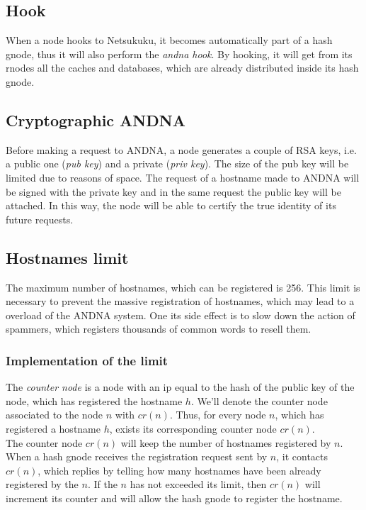 \documentclass[a4paper]{article}
\begin{document}
\subsection{Hook}

When a node hooks to Netsukuku, it becomes automatically part of a hash gnode,
thus it will also perform the \emph{andna hook}.
By hooking, it will get from its rnodes all the caches and databases, which
are already distributed inside its hash gnode.

\subsection{Cryptographic ANDNA}
  
Before making a request to ANDNA, a node generates a couple of RSA keys,
i.e. a public one (\emph{pub key}) and a private (\emph{priv key}). The size of the
pub key will be limited due to reasons of space.
The request of a hostname made to ANDNA will be signed with the private key
and in the same request the public key will be attached.
In this way, the node will be able to certify the true identity of its
future requests.

\subsection{Hostnames limit}

The maximum number of hostnames, which can be registered is 256.
This limit is necessary to prevent the massive registration of hostnames,
which may lead to a overload of the ANDNA system. One its side effect is to
slow down the action of spammers, which registers thousands of common words to
resell them.

\subsubsection{Implementation of the limit}
The \emph{counter node} is a node with an ip equal to the hash of the public
key of the node, which has registered the hostname $h$. We'll denote the
counter node associated to the node $n$ with $cr(n)$.
Thus, for every node $n$, which has registered a hostname $h$, exists its
corresponding counter node $cr(n)$.\\

The counter node $cr(n)$ will keep the number of hostnames registered by
$n$.\\

When a hash gnode receives the registration request sent by $n$, it contacts
$cr(n)$, which replies by telling how many hostnames have been already registered
by the $n$. If the $n$ has not exceeded its limit, then $cr(n)$  will increment its counter
and will allow the hash gnode to register the hostname.
\end{document}
